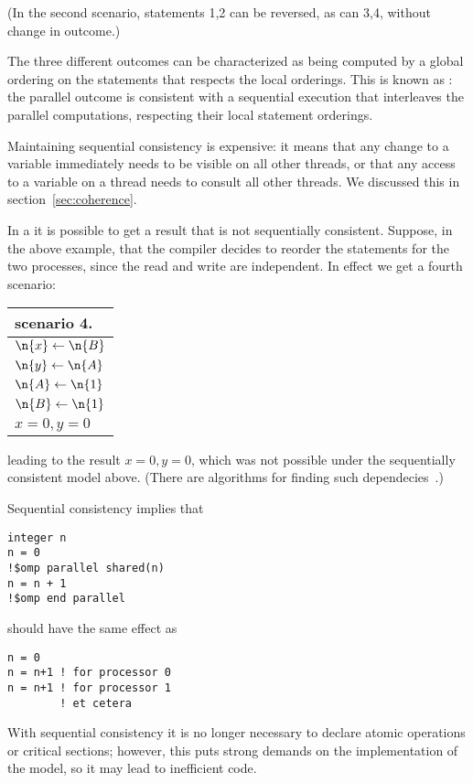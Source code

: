 (In the second scenario, statements 1,2 can be reversed, as can 3,4,
without change in outcome.)

The three different outcomes can be characterized as being computed by a global ordering
on the statements that respects the local orderings. This is known as : the parallel outcome is consistent with a sequential execution that
interleaves the parallel computations, respecting their local statement orderings.

Maintaining sequential consistency is expensive: it means that any change to a variable
immediately needs to be visible on all other threads, or that any access to a variable
on a thread
needs to consult all other threads. We discussed this in section~\ref{sec:coherence}.

In a  it is possible to get a result that
is not sequentially consistent. Suppose, in the above example,
that the compiler decides to reorder the
statements for the two processes, since the read and write are independent.
In effect we get a fourth scenario:

\begin{tabular}{|l|}
  \hline
  scenario 4.\\ \hline
  $\n{x}\leftarrow \n{B}$\\
  $\n{y}\leftarrow \n{A}$\\
  $\n{A}\leftarrow \n{1}$\\
  $\n{B}\leftarrow \n{1}$\\
  \hline
  $x=0, y=0$\\
  \hline
\end{tabular}

leading to the result $x=0,y=0$, which was not possible under the
sequentially consistent model above. (There are algorithms for finding
such dependecies~\cite{KrishnaYelick:cycledetect}.)


Sequential consistency implies that
\begin{verbatim}
integer n
n = 0
!$omp parallel shared(n)
n = n + 1
!$omp end parallel
\end{verbatim}
should have the same effect as
\begin{verbatim}
n = 0
n = n+1 ! for processor 0
n = n+1 ! for processor 1
        ! et cetera
\end{verbatim}
With sequential consistency it is no longer necessary to declare
atomic operations or critical sections; however, this puts strong
demands on the implementation of the model, so it may lead to
inefficient code.

